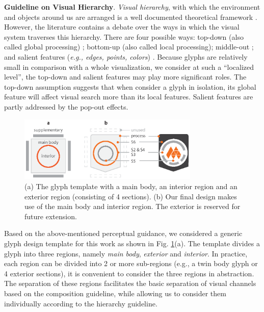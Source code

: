 \textbf{Guideline on Visual Hierarchy}.
%
\emph{Visual hierarchy}, with which the environment and objects around us are arranged is a well documented theoretical framework \cite{palmer77,navon77, love99, kinchla79,bar04}.
However, the literature contains a debate over the ways in which the visual system traverses this hierarchy.
There are four possible ways:
top-down (also called global processing) \cite{navon77};
bottom-up (also called local processing);
middle-out \cite{kinchla79};
and salient features (\emph{e.g., edges, points, colors}) \cite{rumelhart70}.
Because glyphs are relatively small in comparison with a whole visualization, we consider at such a ``localized level'', the top-down and salient features may play more significant roles.
The top-down assumption suggests that when consider a glyph in isolation, its global feature will affect visual search more than its local features.
Salient features are partly addressed by the pop-out effects.

\begin{figure}[t]
\centering
\includegraphics[width=86mm]{images/glyph-taxonomy/glyph-space.eps}
\caption{(a) The glyph template with a main body, an interior region and an exterior region (consisting of 4 sections).
(b) Our final design makes use of the main body and interior region.
The exterior is reserved for future extension.
}
\label{fig:glyph-design}
\vspace{-10pt}
\end{figure}

Based on the above-mentioned perceptual guidance, we considered a generic glyph design template for this work as shown in Fig. \ref{fig:glyph-design}(a).
The template divides a glyph into three regions, namely \emph{main body}, \emph{exterior} and \emph{interior}.
In practice, each region can be divided into 2 or more sub-regions (e.g., a twin body glyph or 4 exterior sections), it is convenient to consider the three regions in abstraction.
The separation of these regions facilitates the basic separation of visual channels based on the composition guideline, while allowing us to consider them individually according to the hierarchy guideline.

